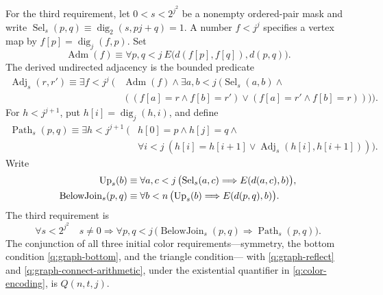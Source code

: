 \begin{definition}
For the third requirement, let $0<s<2^{j^2}$ be a nonempty ordered-pair
mask and write
$\operatorname{Sel}_s(p,q)\equiv\operatorname{dig}_2(s,pj+q)=1$.
A number $f<j^j$ specifies a vertex map by
$f[p]=\operatorname{dig}_j(f,p)$.  Set
\begin{equation}\label{q:placement-arithmetic}
 \operatorname{Adm}(f)\equiv
   \forall p,q<j\ E\bigl(d(f[p],f[q]),d(p,q)\bigr).
\end{equation}
The derived undirected adjacency is the bounded predicate
\begin{equation}\label{q:adjacency-arithmetic}
 \begin{split}
 \operatorname{Adj}_s(r,r')\equiv\exists f<j^j\ \bigl(
   &\operatorname{Adm}(f)\land
       \exists a,b<j\ \bigl(\operatorname{Sel}_s(a,b)\land\\[-2pt]
   &((f[a]=r\land f[b]=r')\lor
                     (f[a]=r'\land f[b]=r))\bigr)\bigr).
 \end{split}
\end{equation}
For $h<j^{j+1}$, put $h[i]=\operatorname{dig}_j(h,i)$, and define
\begin{equation}\label{q:path-arithmetic}
 \begin{split}
 \operatorname{Path}_s(p,q)\equiv\exists h<j^{j+1}\ \bigl(
      &h[0]=p\land h[j]=q\land\\[-2pt]
      &\forall i<j\ (h[i]=h[i+1]\lor
                            \operatorname{Adj}_s(h[i],h[i+1]))\bigr).
 \end{split}
\end{equation}
Write
\begin{align}
 \operatorname{Up}_s(b)&\equiv
   \forall a,c<j\,
       \bigl(\operatorname{Sel}_s(a,c)\Longrightarrow E(d(a,c),b)\bigr),
           \label{q:mask-upper}\\
 \operatorname{BelowJoin}_s(p,q)&\equiv
   \forall b<n\,
       \bigl(\operatorname{Up}_s(b)\Longrightarrow E(d(p,q),b)\bigr).
           \notag
\end{align}
The third requirement is
\begin{equation}\label{q:graph-connect-arithmetic}
 \forall s<2^{j^2}\quad s\ne0\Longrightarrow
   \forall p,q<j\,
     \bigl(\operatorname{BelowJoin}_s(p,q)
                          \Longrightarrow\operatorname{Path}_s(p,q)\bigr).
\end{equation}
The conjunction of all three initial color requirements---symmetry,
the bottom condition \eqref{q:graph-bottom}, and the triangle condition---
with \eqref{q:graph-reflect} and \eqref{q:graph-connect-arithmetic},
under the existential quantifier in \eqref{q:color-encoding},
is $Q(n,t,j)$.
\end{definition}

